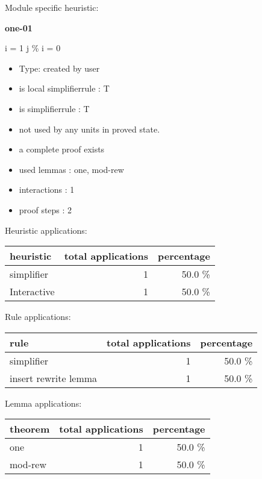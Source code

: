 \documentclass[a4paper]{article}
\begin{document}
Module specific heuristic:

\pagebreak

{\LARGE\bf one-01}\label{lemma-one-01}

\medskip

 \Fol i = 1 \Imp j \% i = 0

\begin{itemize}

\item Type: created by user

\item is local simplifierrule : T
\item is simplifierrule : T
\item not used by any units in proved state.
\item       a complete proof exists
\item       used lemmas  : one, mod-rew
\item       interactions : 1
\item       proof steps  : 2
\end{itemize}

\medskip


Heuristic applications:

\begin{supertabular}{l|r|r}
heuristic	& total applications & percentage \\ \hline
simplifier & 1 & 50.0 \% \\
Interactive & 1 & 50.0 \% \\

\end{supertabular}

Rule applications:

\begin{supertabular}{l|r|r}
rule	        & total applications & percentage \\ \hline
simplifier & 1 & 50.0 \% \\
insert rewrite lemma & 1 & 50.0 \% \\

\end{supertabular}

Lemma applications:

\begin{supertabular}{l|r|r}
theorem	        & total applications & percentage \\ \hline
one & 1 & 50.0 \% \\
mod-rew & 1 & 50.0 \% \\

\end{supertabular}
\end{document}

